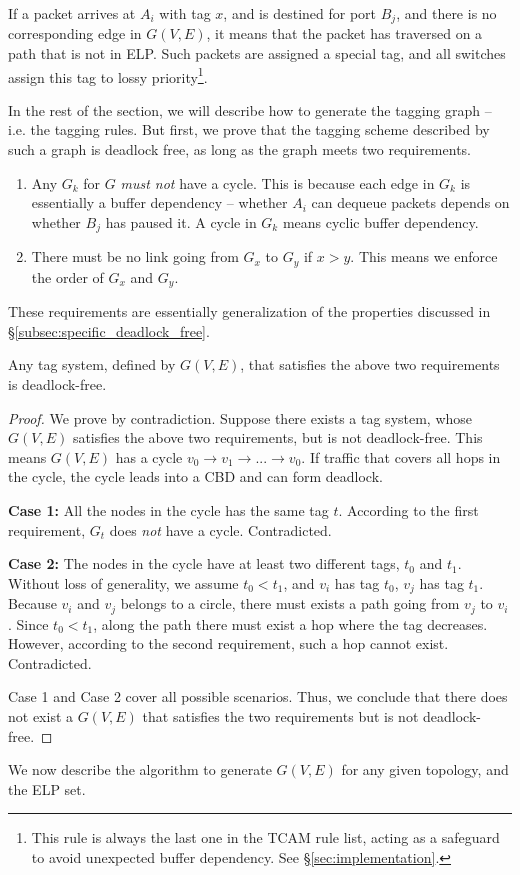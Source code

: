 If a packet arrives at $A_i$ with tag $x$, and is destined for port $B_j$, and
there is no corresponding edge in $G(V,E)$, it means that the packet has
traversed on a path that is not in ELP.  Such packets are assigned a special
tag, and all switches assign this tag to lossy priority\footnote{This rule is
always the last one in the TCAM rule list, acting as a safeguard to avoid
unexpected buffer dependency.  See \S\ref{sec:implementation}.}.

In the rest of the section, we will describe how to generate the tagging graph
-- i.e. the tagging rules. But first, we prove that the tagging scheme described
by such a graph is deadlock free, as long as the graph meets two requirements.

\begin{enumerate}

		\item  Any $G_k$ for $G$ {\em must not} have a cycle.  This is
				because each edge in $G_k$ is essentially a buffer dependency --
				whether $A_i$ can dequeue packets depends on whether $B_j$ has
				paused it. A cycle in $G_k$ means cyclic buffer
				dependency.
		\item There must be no link going from
				$G_x$ to $G_y$ if $x>y$.  This means we enforce the order of
				$G_x$ and $G_y$.
\end{enumerate}
These requirements are essentially generalization of the properties
discussed in \S\ref{subsec:specific_deadlock_free}.
\begin{theorem}
Any tag system, defined by $G(V,E)$, that satisfies the above two requirements is deadlock-free.
\end{theorem}

\begin{proof}
We prove by contradiction. Suppose there exists a tag system,
whose $G(V,E)$ satisfies the above two requirements, but is not deadlock-free. This means
$G(V,E)$ has a cycle $v_0 \rightarrow v_1 \rightarrow ... \rightarrow v_0$. If
traffic that covers all hops in the cycle, the cycle leads into a CBD and can form deadlock.

\textbf{Case 1:} All the nodes in the cycle has the same tag $t$. According to
the first requirement, $G_t$ does {\em not} have a cycle. Contradicted.

\textbf{Case 2:} The nodes in the cycle have at least two different tags, $t_0$ and $t_1$.
Without loss of generality, we assume $t_0 < t_1$, and $v_i$ has tag $t_0$, $v_j$
has tag $t_1$. Because $v_i$ and $v_j$ belongs to a circle, there must exists
a path going from $v_j$ to $v_i$. Since $t_0 < t_1$, along the path there must exist
a hop where the tag decreases. However, according to the second requirement, such a hop
cannot exist. Contradicted.

Case 1 and Case 2 cover all possible scenarios. Thus, we conclude that there does not
exist a $G(V,E)$ that satisfies the two requirements but is not deadlock-free.
\end{proof}
We now describe the algorithm to generate $G(V,E)$ for any given topology, and
the ELP set.
